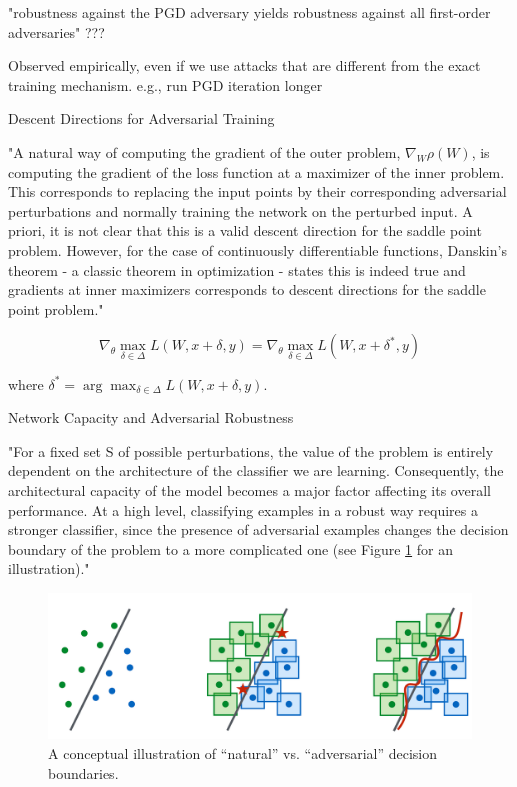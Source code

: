 \documentclass[english]{article}
\begin{document}
\item "robustness against the PGD adversary yields
robustness against all first-order adversaries" ???

Observed empirically, even if we use attacks that are different from the exact training mechanism. e.g., run PGD iteration longer 

\item Descent Directions for Adversarial Training

"A natural way of computing the gradient of the outer problem,
$\nabla_W \rho(W)$, is computing the gradient of the loss function at a maximizer of the inner problem. This
corresponds to replacing the input points by their corresponding adversarial perturbations and
normally training the network on the perturbed input. A priori, it is not clear that this is a valid
descent direction for the saddle point problem. However, for the case of continuously differentiable
functions, Danskin's theorem - a classic theorem in optimization - states this is indeed true and
gradients at inner maximizers corresponds to descent directions for the saddle point problem."


$$\nabla_\theta \max_{\delta\in \Delta}
L(W,x+\delta,y)
= 
\nabla_\theta \max_{\delta\in \Delta}
L(W,x+\delta^*,y)
$$

where $\delta^* = \arg\max_{\delta\in \Delta}
L(W,x+\delta,y)$.

\item Network Capacity and Adversarial Robustness

"For a fixed set S of possible perturbations, the value of the problem is entirely dependent on the
architecture of the classifier we are learning. Consequently, the architectural capacity of the model
becomes a major factor affecting its overall performance. At a high level, classifying examples in
a robust way requires a stronger classifier, since the presence of adversarial examples changes the
decision boundary of the problem to a more complicated one (see Figure \ref{natl_adv} for an illustration)."

  \begin{figure}
        \centering
        \includegraphics[scale = 0.35]{natl_adv.PNG}
        
        \caption{A conceptual illustration of “natural” vs. “adversarial” decision boundaries.}
        \label{natl_adv}
    \end{figure}
\end{document}
